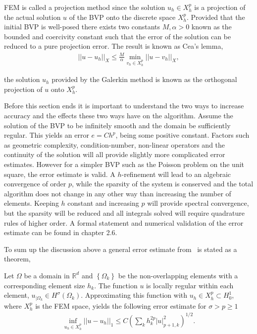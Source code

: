 FEM is called a projection method since the solution $u_h\in X_h^p$ is a projection
of the actual solution $u$ of the BVP onto the discrete space $X_h^p$. Provided that the initial BVP is well-posed there exists two 
constants $M,\alpha>0$ known as the bounded and coercivity constant such that the error of the solution can be reduced to a pure 
projection error. The result is known as Cea's lemma,  
\begin{align}
    ||u-u_h||_X \leq \frac{M}{\alpha}\min_{v_h\in X_h^p}||u-v_h||_X,
    \label{eq:Cea}
\end{align}

the solution $u_h$ provided by the Galerkin method is known as the orthogonal projection of $u$ onto $X_h^p$. 

Before this section ends it is important to understand the two ways to increase accuracy and the effects these two ways have on the algorithm. 
Assume the solution of the BVP to be infinitely smooth and the domain be sufficiently regular. 
This yields an error $e = Ch^p$, being some positive constant.
Factors such as geometric complexity, condition-number, non-linear operators and the continuity of the 
solution will all provide slightly more complicated error estimates. 
However for a simpler BVP such as the Poisson problem on the unit square, the error estimate is valid.  
A $h$-refinement will lead to an algebraic convergence of order $p$, while the sparsity of the system is conserved
and the total algorithm does not change in any other way than increasing the number of elements.
Keeping $h$ constant and increasing $p$ will provide spectral convergence, but the sparsity will be reduced and all integrals solved will require 
quadrature rules of higher order. A formal statement and numerical validation of the error estimate can be found in \cite{Karniadakis} chapter 2.6.  

To sum up the discussion above a general error estimate from~\cite{Quarteroni} is stated as a theorem, 
\begin{theorem}
    Let $\Omega$ be a domain in $\mathbb{R}^d$ and $\left\{ \Omega_k \right\}$ 
    be the non-overlapping elements with a corresponding element size $h_k$.
    The function $u$ is locally regular within each element,
    $u_{|\Omega_k} \in H^{\sigma}(\Omega_k)$. 
    Approximating this function with $u_h \in X_h^p \subset H^1_0$, where $X_h^p$ 
    is the FEM space, yields the following error estimate for $ \sigma > p \ge 1$ 
\begin{align}
    \inf_{u_h \in X_h^p} ||u-u_h||_1 \le C\left( \sum_{k} h_k^{2p}|u|^2_{p+1,k} \right)^{1/2}.
\end{align}
    \label{thm:femconvergence}
\end{theorem}
%

